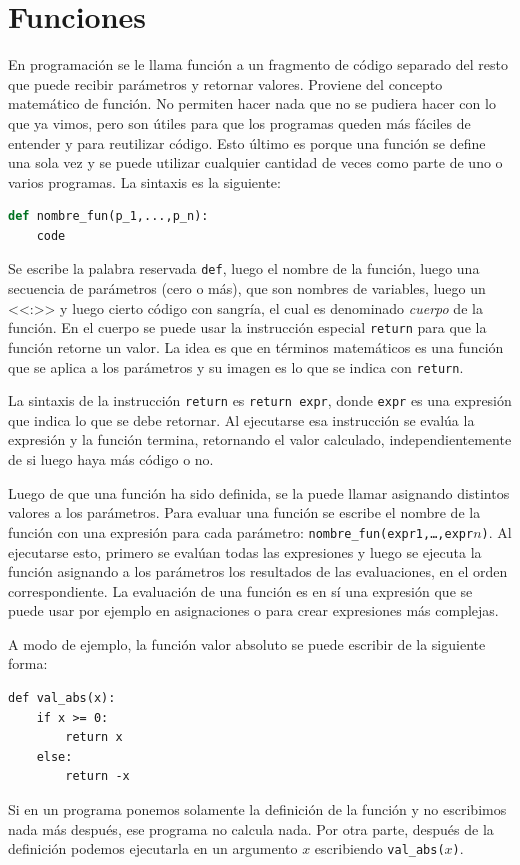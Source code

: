 \documentclass[a4paper, 12pt]{report}
\theoremstyle{definition}
\begin{document}
\section{Funciones}\label{sec-funciones}


En programación se le llama función a un fragmento de código separado del resto que puede recibir parámetros y retornar valores. Proviene del concepto matemático de función. No permiten hacer nada que no se pudiera hacer con lo que ya vimos, pero son útiles para que los programas queden más fáciles de entender y para reutilizar código. Esto último es porque una función se define una sola vez y se puede utilizar cualquier cantidad de veces como parte de uno o varios programas. La sintaxis es la siguiente:
\begin{lstlisting}[language=python]
def nombre_fun(p_1,...,p_n):
    code	
\end{lstlisting}
Se escribe la palabra reservada {\tt def}, luego el nombre de la función, luego una secuencia de parámetros (cero o más), que son nombres de variables, luego un <<:>> y luego cierto código con sangría, el cual es denominado {\sl cuerpo} de la función. En el cuerpo se puede usar la instrucción especial {\tt return} para que la función retorne un valor. La idea es que en términos matemáticos es una función que se aplica a los parámetros y su imagen es lo que se indica con {\tt return}.

La sintaxis de la instrucción {\tt return} es {\tt return expr}, donde {\tt expr} es una expresión que indica lo que se debe retornar. Al ejecutarse esa instrucción se evalúa la expresión y la función termina, retornando el valor calculado, independientemente de si luego haya más código o no.

Luego de que una función ha sido definida, se la puede llamar asignando distintos valores a los parámetros. Para evaluar una función se escribe el nombre de la función con una expresión para cada parámetro: {\tt nombre\_fun(expr1,\dots,expr$n$)}. Al ejecutarse esto, primero se evalúan todas las expresiones y luego se ejecuta la función asignando a los parámetros los resultados de las evaluaciones, en el orden correspondiente. La evaluación de una función es en sí una expresión que se puede usar por ejemplo en asignaciones o para crear expresiones más complejas.

A modo de ejemplo, la función valor absoluto se puede escribir de la siguiente forma:
\begin{verbatim}
def val_abs(x):
    if x >= 0:
        return x
    else:
        return -x
\end{verbatim}
Si en un programa ponemos solamente la definición de la función y no escribimos nada más después, ese programa no calcula nada. Por otra parte, después de la definición podemos ejecutarla en un argumento $x$ escribiendo {\tt val\_abs($x$)}. 
\end{document}
